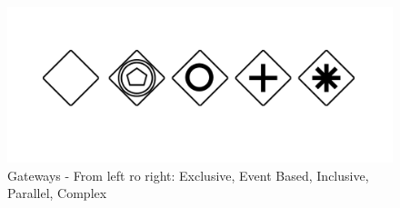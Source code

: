 \\

\begin{figure}[htbp]
	\centering
		\includegraphics{images/gateways.png}
	\caption{Gateways - From left ro right: Exclusive, Event Based, Inclusive, Parallel, Complex}
	\label{fig:gateways}
\end{figure}



